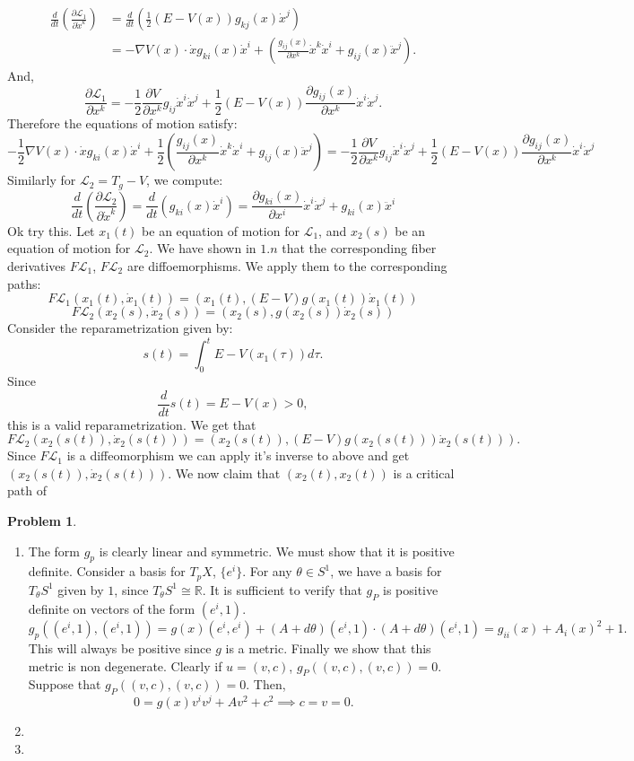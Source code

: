 \documentclass[12pt, a4paper]{article}
\newtheorem{problem}{Problem}
\theoremstyle{definition}
\newcommand{\penum}{ \begin{enumerate}[label=\bf(\alph*), leftmargin=0pt]}
\newcommand{\epenum}{ \end{enumerate} }
\newcommand{\R}{\mathbb{R}}                           %
\newcommand{\eL}{\mathcal{L}}                         %
\newcommand{\grad}{\nabla}
\begin{document}
\begin{align*}
\frac{d}{dt} \left(\frac{\partial \eL_1}{\partial \dot{x}^k}\right) &= \frac{d}{dt} \left(\frac{1}{2}(E-V(x))g_{kj}(x) \dot{x}^j \right)
\\ & = -\grad V(x) \cdot \dot{x} g_{ki}(x)\dot{x}^i  +  \left( \frac{g_{ij}(x)}{\partial x^k} \dot{x}^k \dot{x}^i + g_{ij}(x)\ddot{x}^j \right).
\end{align*}
And,
$$\frac{\partial \eL_1}{\partial x^k} =-\frac{1}{2} \frac{\partial V}{\partial x^k}  g_{ij}\dot{x}^i \dot{x}^j  + \frac{1}{2}(E - V(x)) \frac{\partial g_{ij}(x)}{\partial x^k} \dot{x}^i \dot{x}^j.$$
Therefore the equations of motion satisfy: 
$$-\frac{1}{2} \grad V(x) \cdot \dot{x} g_{ki}(x)\dot{x}^i  + \frac{1}{2} \left( \frac{g_{ij}(x)}{\partial x^k} \dot{x}^k \dot{x}^i + g_{ij}(x)\ddot{x}^j \right) =  -\frac{1}{2} \frac{\partial V}{\partial x^k}  g_{ij}\dot{x}^i \dot{x}^j  + \frac{1}{2}(E - V(x)) \frac{\partial g_{ij}(x)}{\partial x^k} \dot{x}^i \dot{x}^j$$
Similarly for $\eL_2 = T_g - V$, we compute:
	$$\frac{d}{dt} \left( \frac{\partial \eL_2}{\partial \dot{x}^k}\right)  = \frac{d}{dt} \left( g_{ki}(x) \dot{x}^i \right) 
 = \frac{ \partial g_{ki}(x)}{\partial x^i} \dot{x}^i \dot{x}^j + g_{ki}(x) \ddot{x}^i $$
 Ok try this. 
 Let $x_1(t)$ be an equation of motion for $\eL_1$, and $x_2(s)$ be an equation of motion for $\eL_2$. We have shown in $1.n$ that the corresponding fiber derivatives $F \eL_1$, $F\eL_2$ are diffoemorphisms. We apply them to the corresponding paths: 
 $$ F \eL_1(x_1(t), \dot{x}_1(t))= \left(x_1(t), (E-V) g(x_1(t))\dot{x}_1(t) \right)  $$ 
 $$ F \eL_2(x_2(s), \dot{x}_2(s)) = \left(x_2(s), g(x_2(s)) \dot{x}_2(s) \right)  $$ 
 Consider the reparametrization given by:
$$ s(t) = \int_0^t E - V(x_1(\tau)) d\tau. $$ 
Since
$$ \frac{d}{dt} s(t) = E- V(x) >0, $$ 
this is a valid reparametrization. 
We get that
$$ F \eL_2(x_2(s(t)), \dot{x}_2(s(t))) = \left(x_2(s(t)) ,(E-V) g(x_2(s(t)))\dot{x}_2(s(t))  \right) . $$ 
Since $F\eL_1$ is a diffeomorphism we can apply it's inverse to above and get $(x_2(s(t)), \dot{x}_2(s(t))).$
We now claim that $(x_2(t), x_2(t))$ is a critical path of 
\newpage
\begin{problem}
\end{problem}
\penum
\item The form $g_p$ is clearly linear and symmetric. We must show that it is positive definite. Consider a basis for $T_pX$, $\{e^i\}$. For any $\theta \in S^1$, we have a basis for $T_\theta S^1$ given by $1$, since $T_\theta S^1 \cong\R$. It is sufficient to verify that $g_P$ is positive definite
on vectors of the form $(e^i, 1)$.
$$g_p((e^i, 1),(e^i,1)) = g(x)(e^i, e^i) + (A + d\theta )(e^i,1) \cdot (A + d\theta)(e^i, 1) =g_{ii}(x) + A_i(x)^2  + 1. $$
This will always be positive since $g$ is a metric. Finally we show that this metric is non degenerate. Clearly if $u = (v,c)$, $g_P((v,c),(v,c)) = 0$. Suppose that $g_P((v,c),(v,c)) = 0$. Then, 
$$0 = g(x)v^{i}v^{j}  +  Av^2 + c^2 \implies c=v=0.$$
\item
\item 
\epenum
\newpage
\end{document}
